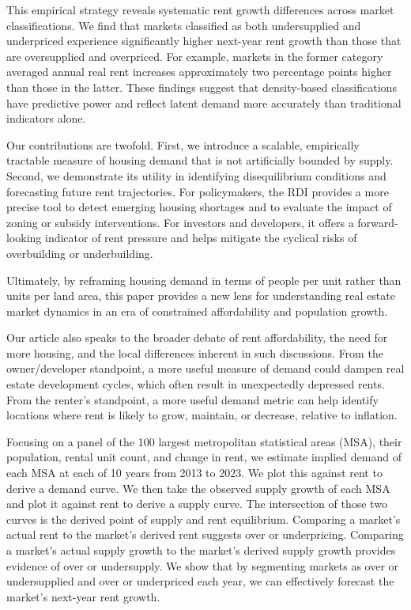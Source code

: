 \documentclass[APA,Times1COL]{WileyNJDv5} %
\begin{document}
This empirical strategy reveals systematic rent growth differences across market classifications. We find that markets classified as both undersupplied and underpriced experience significantly higher next-year rent growth than those that are oversupplied and overpriced. For example, markets in the former category averaged annual real rent increases approximately two percentage points higher than those in the latter. These findings suggest that density-based classifications have predictive power and reflect latent demand more accurately than traditional indicators alone.

Our contributions are twofold. First, we introduce a scalable, empirically tractable measure of housing demand that is not artificially bounded by supply. Second, we demonstrate its utility in identifying disequilibrium conditions and forecasting future rent trajectories. For policymakers, the RDI provides a more precise tool to detect emerging housing shortages and to evaluate the impact of zoning or subsidy interventions. For investors and developers, it offers a forward-looking indicator of rent pressure and helps mitigate the cyclical risks of overbuilding or underbuilding.

Ultimately, by reframing housing demand in terms of people per unit rather than units per land area, this paper provides a new lens for understanding real estate market dynamics in an era of constrained affordability and population growth.

Our article also speaks to the broader debate of rent affordability, the need for more housing, and the local differences inherent in such discussions. From the owner/developer standpoint, a more useful measure of demand could dampen real estate development cycles, which often result in unexpectedly depressed rents. From the renter's standpoint, a more useful demand metric can help identify locations where rent is likely to grow, maintain, or decrease, relative to inflation.  

Focusing on a panel of the 100 largest metropolitan statistical areas (MSA), their population, rental unit count, and change in rent, we estimate implied demand of each MSA at each of 10 years from 2013 to 2023. We plot this against rent to derive a demand curve. We then take the observed supply growth of each MSA and plot it against rent to derive a supply curve. The intersection of those two curves is the derived point of supply and rent equilibrium. Comparing a market's actual rent to the market's derived rent suggests over or underpricing. Comparing a market's actual supply growth to the market's derived supply growth provides evidence of over or undersupply. We show that by segmenting markets as over or undersupplied and over or underpriced each year, we can effectively forecast the market's next-year rent growth.  
\end{document}
